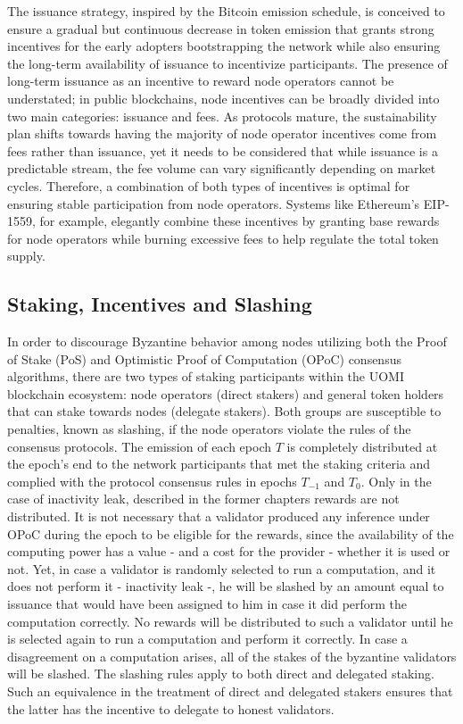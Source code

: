 \documentclass{article}
\begin{document}
The issuance strategy, inspired by the Bitcoin emission schedule, is conceived to ensure a gradual but continuous decrease in token emission that grants strong incentives for the early adopters bootstrapping the network while also ensuring the long-term availability of issuance to incentivize participants.
The presence of long-term issuance as an incentive to reward node operators cannot be understated; in public blockchains, node incentives can be broadly divided into two main categories: issuance and fees. As protocols mature, the sustainability plan shifts towards having the majority of node operator incentives come from fees rather than issuance, yet it needs to be considered that while issuance is a predictable stream, the fee volume can vary significantly depending on market cycles. Therefore, a combination of both types of incentives is optimal for ensuring stable participation from node operators. Systems like Ethereum’s EIP-1559, for example, elegantly combine these incentives by granting base rewards for node operators while burning excessive fees to help regulate the total token supply. 

\subsection{Staking, Incentives and Slashing}

In order to discourage Byzantine behavior among nodes utilizing both the Proof of Stake (PoS) and Optimistic Proof of Computation (OPoC) consensus algorithms, there are two types of staking participants within the UOMI blockchain ecosystem: node operators (direct stakers) and general token holders that can stake towards nodes (delegate stakers). Both groups are susceptible to penalties, known as slashing, if the node operators violate the rules of the consensus protocols. 
The emission of each epoch \(T\) is completely distributed at the epoch's end to the network participants that met the staking criteria and complied with the protocol consensus rules in epochs \( T_{-1} \) and \(T_0\). Only in the case of inactivity leak, described in the former chapters rewards are not distributed. It is not necessary that a validator produced any inference under OPoC during the epoch to be eligible for the rewards, since the availability of the computing power has a value - and a cost for the provider - whether it is used or not. 
Yet, in case a validator is randomly selected to run a computation, and it does not perform it - inactivity leak -, he will be slashed by an amount equal to issuance that would have been assigned to him in case it did perform the computation correctly. No rewards will be distributed to such a validator until he is selected again to run a computation and perform it correctly. In case a disagreement on a computation arises, all of the stakes of the byzantine validators will be slashed. The slashing rules apply to both direct and delegated staking. Such an equivalence in the treatment of direct and delegated stakers ensures that the latter has the incentive to delegate to honest validators.
\end{document}
